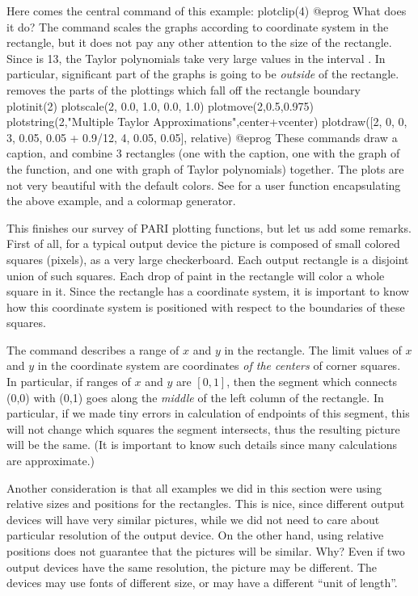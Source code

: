 Here comes the central command of this example:
\bprog
  plotclip(4)
@eprog\noindent
What does it do?  The command  scales the
graphs according to coordinate system in the rectangle, but it does not pay
any other attention to the size of the rectangle.  Since  is 13,
the Taylor polynomials take very large values in the interval
.  In particular, significant part of the graphs is going
to be \emph{outside} of the rectangle.  removes the parts of
the plottings which fall off the rectangle boundary
\bprog
  plotinit(2)
  plotscale(2, 0.0, 1.0, 0.0, 1.0)
  plotmove(2,0.5,0.975)
  plotstring(2,"Multiple Taylor Approximations",center+vcenter)
  plotdraw([2, 0, 0,  3, 0.05, 0.05 + 0.9/12,  4, 0.05, 0.05], relative)
@eprog\noindent
These commands draw a caption, and combine 3 rectangles (one with the
caption, one with the graph of the function, and one with graph of Taylor
polynomials) together. The plots are not very beautiful with the default
colors. See  for a user function encapsulating the
above example, and a colormap generator.

This finishes our survey of PARI plotting functions, but let us add
some remarks.  First of all, for a typical output device the picture is
composed of small colored squares (pixels), as a very large checkerboard.
Each output rectangle is a disjoint union of such squares.  Each drop
of paint in the rectangle will color a whole square in it.  Since the
rectangle has a coordinate system, it is important to know how this
coordinate system is positioned with respect to the boundaries of these
squares.

The command  describes a range of $x$ and $y$ in the
rectangle.  The limit values of $x$ and $y$ in the coordinate system are
coordinates \emph{of the centers} of corner squares.  In particular,
if ranges of $x$ and $y$ are $[0,1]$, then the segment which connects (0,0)
with (0,1) goes along the \emph{middle} of the left column of the rectangle.
In particular, if we made tiny errors in calculation of endpoints of this
segment, this will not change which squares the segment intersects, thus
the resulting picture will be the same.  (It is important to know such details
since many calculations are approximate.)

Another consideration is that all examples we did in this section were
using relative sizes and positions for the rectangles.  This is nice, since
different output devices will have very similar pictures, while we
did not need to care about particular resolution of the output device.
On the other hand,
using relative positions does not guarantee that the pictures will be
similar.  Why?  Even if two output devices have the same resolution,
the picture may be different.  The devices may use fonts of different
size, or may have a different ``unit of length''.

